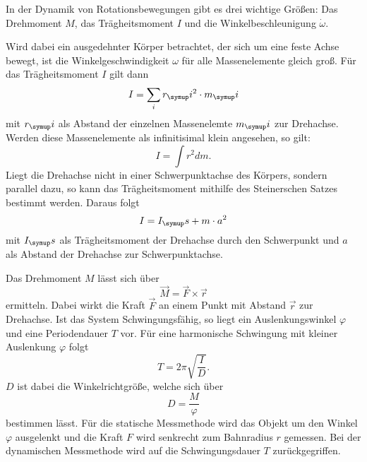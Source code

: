 In der Dynamik von Rotationsbewegungen gibt es drei wichtige Größen:
Das Drehmoment $M$, das Trägheitsmoment $I$ und die Winkelbeschleunigung $\dot
\omega$.

Wird dabei ein ausgedehnter Körper betrachtet, der sich um eine feste Achse bewegt,
ist die Winkelgeschwindigkeit $\omega$ für alle Massenelemente gleich groß.
Für das Trägheitsmoment $I$ gilt dann
\begin{equation}
  I = \sum_i r_\su{i}^2 \cdot m_\su{i}
\end{equation}
mit $r_\su{i}$ als Abstand der einzelnen Massenelemte $m_\su{i}$ zur Drehachse.
Werden diese Massenelemente als infinitisimal klein angesehen, so gilt:
\begin{equation}
  I = \int r^2dm.
\end{equation}
Liegt die Drehachse nicht in einer Schwerpunktachse des Körpers, sondern parallel dazu,
so kann das Trägheitsmoment mithilfe des Steinerschen Satzes bestimmt werden.
Daraus folgt
\begin{equation}
  I = I_\su{s} + m \cdot a^2
\end{equation}
mit $I_\su{s}$ als Trägheitsmoment der Drehachse durch den Schwerpunkt und $a$ als
Abstand der Drehachse zur Schwerpunktachse.

Das Drehmoment $M$ lässt sich über
\begin{equation}
  \vec{M} = \vec{F} \times \vec{r}
\end{equation}
ermitteln. Dabei wirkt die Kraft $\vec{F}$ an einem Punkt mit Abstand $\vec{r}$
zur Drehachse.
Ist das System Schwingungsfähig, so liegt ein Auslenkungswinkel $\varphi$ und eine
Periodendauer $T$ vor. Für eine harmonische Schwingung mit kleiner Auslenkung $\varphi$
folgt
\begin{equation}
  T = 2\pi\sqrt{\frac{I}{D}}.
\end{equation}
$D$ ist dabei die Winkelrichtgröße, welche sich über
\begin{equation}
  D = \frac{M}{\varphi}
\end{equation}
bestimmen lässt.
Für die statische Messmethode wird das Objekt um den Winkel $\varphi$ ausgelenkt
und die Kraft $F$ wird senkrecht zum Bahnradius $r$ gemessen.
Bei der dynamischen Messmethode wird auf die Schwingungsdauer $T$ zurückgegriffen.
